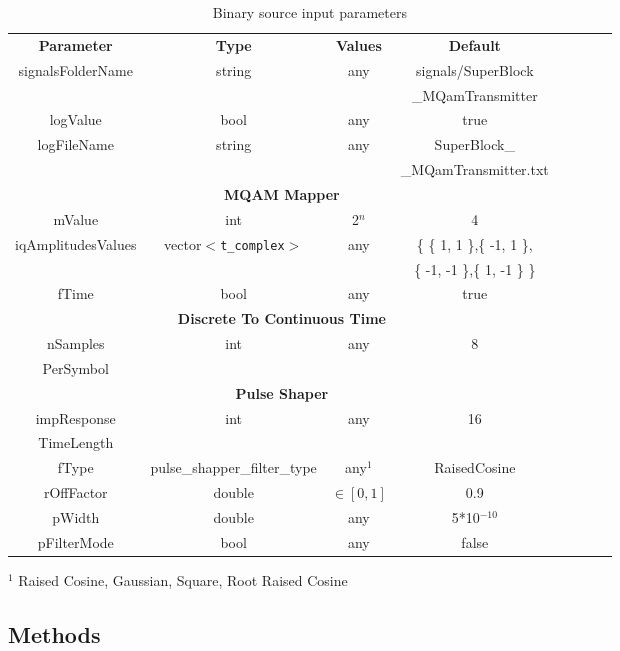 \begin{table}[H]
	\centering
	\begin{tabular}{|c|c|c|c|cccc}
		\cline{1-4}
		\textbf{Parameter} & \textbf{Type} & \textbf{Values} &   \textbf{Default}& \\ \cline{1-4}
        signalsFolderName & string & any & signals/SuperBlock\\
        & & &\_MQamTransmitter \\ \cline{1-4}
        logValue & bool & any & true \\ \cline{1-4}
        logFileName & string & any & SuperBlock\_\\
        & & & \_MQamTransmitter.txt \\ \cline{1-4}
		\multicolumn{4}{|c|}{ \textbf{MQAM Mapper} } \\ \cline{1-4}
		mValue & int & 2$^n$ & 4\\ \cline{1-4}
		iqAmplitudesValues & vector$<$\texttt{t\_complex}$>$ & any & \{ \{ 1, 1 \},\{ -1, 1 \},\\
        & & &\{ -1, -1 \},\{ 1, -1 \} \} \\ \cline{1-4}
		fTime & bool & any &  true\\ \cline{1-4}
		\multicolumn{4}{|c|}{ \textbf{Discrete To Continuous Time} } \\ \cline{1-4}
		nSamples & int & any & 8 \\
        PerSymbol & & & \\ \cline{1-4}
		\multicolumn{4}{|c|}{ \textbf{Pulse Shaper} } \\ \cline{1-4}
		impResponse & int & any & 16 \\
        TimeLength & & & \\ \cline{1-4}
        fType   & pulse\_shapper\_filter\_type & any$^1$ & RaisedCosine \\ \cline{1-4}
        rOffFactor & double & $\in \left[0,1\right]$ & 0.9 \\ \cline{1-4}
        pWidth & double & any & 5*10$^{-10}$ \\ \cline{1-4}
        pFilterMode & bool & any & false \\ \cline{1-4}
	\end{tabular}
	\caption{Binary source input parameters}
	\label{table}
\end{table}
$^1$ Raised Cosine, Gaussian, Square, Root Raised Cosine

\subsection*{Methods}

